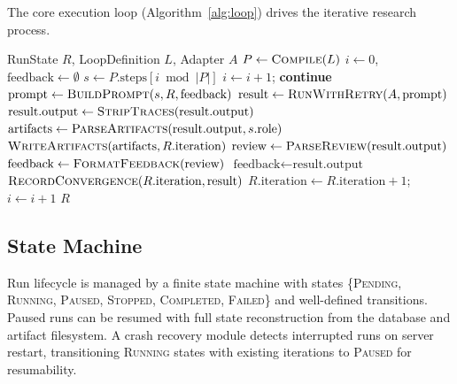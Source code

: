 \documentclass[11pt,a4paper]{article}
\begin{document}
The core execution loop (Algorithm~\ref{alg:loop}) drives the iterative research process.

\begin{algorithm}[h]
\caption{MI-Workbench Execution Loop}
\label{alg:loop}
\begin{algorithmic}[1]
\REQUIRE RunState $R$, LoopDefinition $L$, Adapter $A$
\STATE $P \leftarrow \textsc{Compile}(L)$ 
\STATE $i \leftarrow 0$, $\text{feedback} \leftarrow \emptyset$
  \STATE $s \leftarrow P.\text{steps}[i \bmod |P|]$
    \STATE $i \leftarrow i + 1$; \textbf{continue}
  \ENDIF
  \STATE $\text{prompt} \leftarrow \textsc{BuildPrompt}(s, R, \text{feedback})$
  \STATE $\text{result} \leftarrow \textsc{RunWithRetry}(A, \text{prompt})$
  \STATE $\text{result.output} \leftarrow \textsc{StripTraces}(\text{result.output})$
  \STATE $\text{artifacts} \leftarrow \textsc{ParseArtifacts}(\text{result.output}, s.\text{role})$
  \STATE $\textsc{WriteArtifacts}(\text{artifacts}, R.\text{iteration})$
    \STATE $\text{review} \leftarrow \textsc{ParseReview}(\text{result.output})$
    \STATE $\text{feedback} \leftarrow \textsc{FormatFeedback}(\text{review})$
  \ELSE
    \STATE $\text{feedback} \leftarrow \text{result.output}$
  \ENDIF
  \STATE $\textsc{RecordConvergence}(R.\text{iteration}, \text{result})$
  \STATE $R.\text{iteration} \leftarrow R.\text{iteration} + 1$; $i \leftarrow i + 1$
\ENDWHILE
\RETURN $R$
\end{algorithmic}
\end{algorithm}

\subsection{State Machine}
Run lifecycle is managed by a finite state machine with states \{\textsc{Pending}, \textsc{Running}, \textsc{Paused}, \textsc{Stopped}, \textsc{Completed}, \textsc{Failed}\} and well-defined transitions.
Paused runs can be resumed with full state reconstruction from the database and artifact filesystem.
A crash recovery module detects interrupted runs on server restart, transitioning \textsc{Running} states with existing iterations to \textsc{Paused} for resumability.
\end{document}
